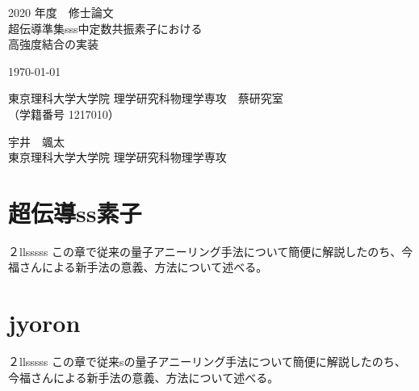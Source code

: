 \documentclass[uplatex,openany,oneside,a4j,11pt]{jsbook}
\begin{document}
\begin{titlepage}
    \begin{center}
        {\Large 2020 年度　修士論文}\\
        \vspace{180truept}
        {\Huge 超伝導準集sss中定数共振素子における\\
        \vspace{10truept}
        高強度結合の実装}\\ 
        \vspace{70truept}

        {\Large \today}\\

        \vspace{70truept}

        {\Large 東京理科大学大学院 理学研究科物理学専攻　蔡研究室\\
        （学籍番号 1217010）}\\

        \vspace{20truept}

        {\huge 宇井　颯太}\\

        \vspace{160truept}
        {\Large 東京理科大学大学院 理学研究科物理学専攻}\\
    \end{center}
\end{titlepage}

\tableofcontents

\chapter{超伝導ss素子}
        ２llsssss
        この章で従来の\cite{nakamura1999coherent}量子アニーリング手法について簡便に解説したのち、今福さんによる新手法の意義、方法について述べる。\\
    

\chapter{jyoron}
    ２llsssss
    この章で従来sの\cite{nakamura1999coherent}量子アニーリング手法について簡便に解説したのち、今福さんによる新手法の意義、方法について述べる。\\
    
\end{document}
